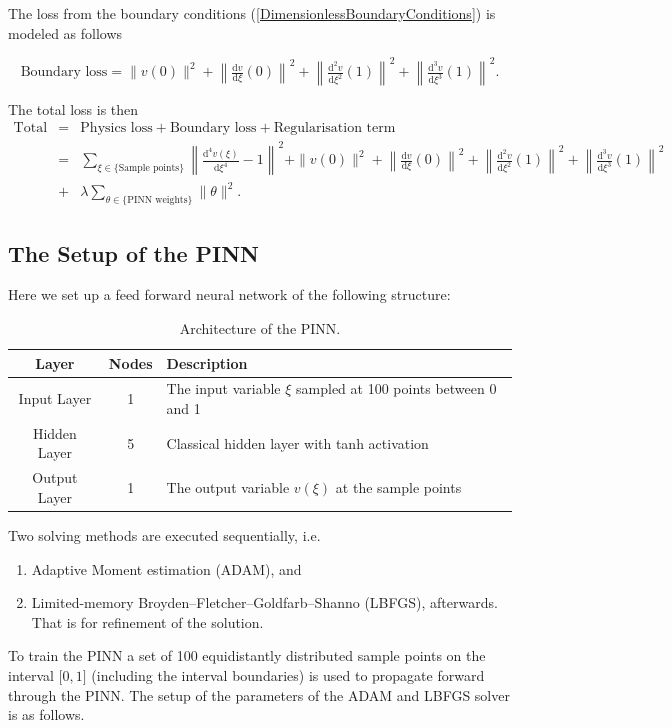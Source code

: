 \documentclass[a4paper,11pt]{article}
\begin{document}
The loss from the boundary conditions (\ref{DimensionlessBoundaryConditions}) is modeled as follows

\begin{equation*}
\text{Boundary loss} = \| v (0) \|^2 + \left\|\tfrac{\mathrm{d} v}{\mathrm{d}\xi}(0) \right\|^2 + \left\|\tfrac{\mathrm{d}^2 v}{\mathrm{d}\xi^2} (1) \right\|^2 + \left\|\tfrac{\mathrm{d}^3 v}{\mathrm{d}\xi^3}(1) \right\|^2 .
\end{equation*}

The total loss is then
\begin{eqnarray} \label{LossDirectProblem}
\text{Total loss} & = & \text{Physics loss} + \text{Boundary loss} + \text{Regularisation term} \\
 & = & \sum_{\xi \in \{\text{Sample points}\}} \left\| \tfrac{\mathrm{d}^4 v(\xi)}{\mathrm{d}\xi^4} -1 \right\|^2 + \| v (0) \|^2 + \left\|\tfrac{\mathrm{d} v}{\mathrm{d}\xi}(0) \right\|^2 + \left\|\tfrac{\mathrm{d}^2 v}{\mathrm{d}\xi^2} (1) \right\|^2 + \left\|\tfrac{\mathrm{d}^3 v}{\mathrm{d}\xi^3}(1) \right\|^2 \\ 
 & + & \lambda \sum_{\theta \in \{\text{PINN weights}\}} \| \theta \|^2 .
\end{eqnarray}

\subsection*{The Setup of the PINN}
Here we set up a feed forward neural network of the following structure:
\begin{table}[h!]
\centering
\begin{tabular}{ccl}
\toprule
\textbf{Layer} & \textbf{Nodes} & \textbf{Description}\\
\midrule
Input Layer & 1 & The input variable $\xi $ sampled at 100 points between 0 and 1\\
Hidden Layer & 5 & Classical hidden layer with tanh activation\\
Output Layer & 1 & The output variable $v(\xi ) $ at the sample points\\
\bottomrule
\end{tabular}
\caption{Architecture of the PINN.}
\end{table}

Two solving methods are executed sequentially, i.e.
\begin{enumerate}
\item Adaptive Moment estimation (ADAM), and
\item Limited-memory Broyden–Fletcher–Goldfarb–Shanno (LBFGS), afterwards. That is for refinement of the solution.
\end{enumerate}
To train the PINN a set of 100 equidistantly distributed sample points on the interval $\lbrack 0, 1 \rbrack $ (including the interval boundaries) is used to propagate forward through the PINN. The setup of the parameters of the ADAM and LBFGS solver is as follows.
\end{document}
